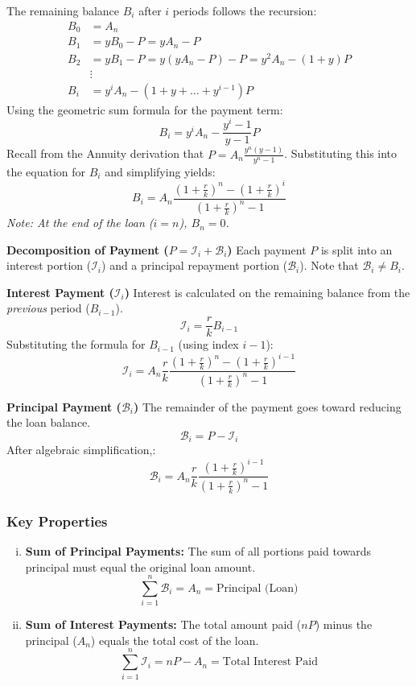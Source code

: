 The remaining balance $B_i$ after $i$ periods follows the recursion:
\begin{align*}
    B_0 &= A_n \\
    B_1 &= y B_0 - P = y A_n - P \\
    B_2 &= y B_1 - P = y(y A_n - P) - P = y^2 A_n - (1+y)P \\
    &\vdots \\
    B_i &= y^i A_n - (1 + y + \dots + y^{i-1})P
\end{align*}
Using the geometric sum formula for the payment term:
\[
B_i = y^i A_n - \frac{y^i - 1}{y - 1} P
\]
Recall from the Annuity derivation that $P = A_n \frac{y^n(y-1)}{y^n - 1}$. Substituting this into the equation for $B_i$ and simplifying yields:
\[
\boxed{B_i = A_n \frac{(1+\frac{r}{k})^n - (1+\frac{r}{k})^i}{(1+\frac{r}{k})^n - 1}}
\]
\textit{Note: At the end of the loan ($i=n$), $B_n = 0$.}

\textbf{Decomposition of Payment ($P = \mathcal{I}_i + \mathcal{B}_i$)}
Each payment $P$ is split into an interest portion ($\mathcal{I}_i$) and a principal repayment portion ($\mathcal{B}_i$). Note that $\mathcal{B}_i \neq B_i$.

\textbf{Interest Payment ($\mathcal{I}_i$)}
Interest is calculated on the remaining balance from the \textit{previous} period ($B_{i-1}$).
\[
\mathcal{I}_i = \frac{r}{k} B_{i-1}
\]
Substituting the formula for $B_{i-1}$ (using index $i-1$):
\[
\boxed{\mathcal{I}_i = A_n \frac{r}{k} \frac{(1+\frac{r}{k})^n - (1+\frac{r}{k})^{i-1}}{(1+\frac{r}{k})^n - 1}}
\]

\textbf{Principal Payment ($\mathcal{B}_i$)}
The remainder of the payment goes toward reducing the loan balance.
\[
\mathcal{B}_i = P - \mathcal{I}_i
\]
After algebraic simplification,:
\[
\boxed{\mathcal{B}_i = A_n \frac{r}{k} \frac{(1+\frac{r}{k})^{i-1}}{(1+\frac{r}{k})^n - 1}}
\]
\subsubsection{Key Properties}
\begin{enumerate}[i.]
    \item \textbf{Sum of Principal Payments:} The sum of all portions paid towards principal must equal the original loan amount.
    \[
    \sum_{i=1}^n \mathcal{B}_i = A_n = \text{Principal (Loan)}
    \]

    \item \textbf{Sum of Interest Payments:} The total amount paid ($nP$) minus the principal ($A_n$) equals the total cost of the loan.
    \[
    \sum_{i=1}^n \mathcal{I}_i = nP - A_n = \text{Total Interest Paid}
    \]
\end{enumerate}


